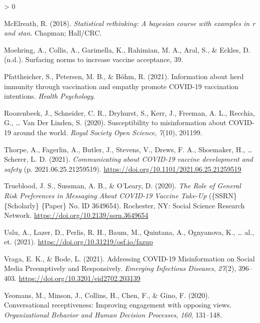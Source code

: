 \documentclass[
  english,
  ,jou,floatsintext]{apa6}
\newlength{\cslhangindent}
\newenvironment{CSLReferences}[2] %
 {%
  \setlength{\parindent}{0pt}
  \ifodd #1 \everypar{\setlength{\hangindent}{\cslhangindent}}\ignorespaces\fi
  \ifnum #2 > 0
  \setlength{\parskip}{#2\baselineskip}
  \fi
 }%
 {}
\begin{document}
\begin{CSLReferences}{1}{0}
\leavevmode\hypertarget{ref-mcelreath2018statistical}{}%
McElreath, R. (2018). \emph{Statistical rethinking: A bayesian course with examples in r and stan}. Chapman; Hall/CRC.

\leavevmode\hypertarget{ref-moehring_surfacing_2021}{}%
Moehring, A., Collis, A., Garimella, K., Rahimian, M. A., Aral, S., \& Eckles, D. (n.d.). Surfacing norms to increase vaccine acceptance, 39.

\leavevmode\hypertarget{ref-pfattheicher2021information}{}%
Pfattheicher, S., Petersen, M. B., \& Böhm, R. (2021). Information about herd immunity through vaccination and empathy promote COVID-19 vaccination intentions. \emph{Health Psychology}.

\leavevmode\hypertarget{ref-roozenbeek2020susceptibility}{}%
Roozenbeek, J., Schneider, C. R., Dryhurst, S., Kerr, J., Freeman, A. L., Recchia, G., \ldots{} Van Der Linden, S. (2020). Susceptibility to misinformation about COVID-19 around the world. \emph{Royal Society Open Science}, \emph{7}(10), 201199.

\leavevmode\hypertarget{ref-thorpe_communicating_2021}{}%
Thorpe, A., Fagerlin, A., Butler, J., Stevens, V., Drews, F. A., Shoemaker, H., \ldots{} Scherer, L. D. (2021). \emph{Communicating about {COVID}-19 vaccine development and safety} (p. 2021.06.25.21259519). \url{https://doi.org/10.1101/2021.06.25.21259519}

\leavevmode\hypertarget{ref-trueblood_role_2020}{}%
Trueblood, J. S., Sussman, A. B., \& O'Leary, D. (2020). \emph{The {Role} of {General} {Risk} {Preferences} in {Messaging} {About} {COVID}-19 {Vaccine} {Take}-{Up}} (\{SSRN\} \{Scholarly\} \{Paper\} No. ID 3649654). Rochester, NY: Social Science Research Network. \url{https://doi.org/10.2139/ssrn.3649654}

\leavevmode\hypertarget{ref-uslu2021}{}%
Uslu, A., Lazer, D., Perlis, R. H., Baum, M., Quintana, A., Ognyanova, K., \ldots{} al., et. (2021). \url{https://doi.org/10.31219/osf.io/fazup}

\leavevmode\hypertarget{ref-vraga_addressing_2021}{}%
Vraga, E. K., \& Bode, L. (2021). Addressing {COVID}-19 {Misinformation} on {Social} {Media} {Preemptively} and {Responsively}. \emph{Emerging Infectious Diseases}, \emph{27}(2), 396--403. \url{https://doi.org/10.3201/eid2702.203139}

\leavevmode\hypertarget{ref-yeomans2020conversational}{}%
Yeomans, M., Minson, J., Collins, H., Chen, F., \& Gino, F. (2020). Conversational receptiveness: Improving engagement with opposing views. \emph{Organizational Behavior and Human Decision Processes}, \emph{160}, 131--148.

\end{CSLReferences}
\end{document}
